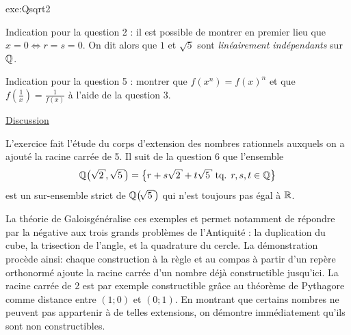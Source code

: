  {exe:Qsqrt2}{
	
	Indication pour la question 2 : il est possible de montrer en premier lieu que $x = 0 \iff r=s=0$.
	On dit alors que $1$ et $\sqrt5$ sont \emph{linéairement indépendants} sur $\mathbb{Q}$.
	
	Indication pour la question 5 : montrer que $f(x^n) = f(x)^n$ et que $f\left(\frac1x\right) = \frac1{f(x)}$ à l'aide de la question 3.
	
	\underline{Discussion}
	
	L'exercice fait l'étude du corps d'extension des nombres rationnels auxquels on a ajouté la racine carrée de 5.
	Il suit de la question 6 que l'ensemble 
		\[ \Q\bigl(\sqrt2, \sqrt5\bigr) = \bigset{ r + s \sqrt2 + t\sqrt5 \tq r, s, t \in \Q} \]
	est un sur-ensemble strict de $\Qsqrt5$ qui n'est toujours pas égal à $\mathbb{R}$.
	
	La {théorie de Galois}\footnotemark généralise ces exemples et permet notamment de répondre par la négative aux trois grands problèmes de l'Antiquité : la duplication du cube, la trisection de l'angle, et la quadrature du cercle.
	La démonstration procède ainsi: chaque construction à la règle et au compas à partir d'un repère orthonormé ajoute la racine carrée d'un nombre déjà constructible jusqu'ici.
	La racine carrée de 2 est par exemple constructible grâce au théorème de Pythagore comme distance entre $(1 ; 0)$ et $(0;1)$.
	En montrant que certains nombres ne peuvent pas appartenir à de telles extensions, on démontre immédiatement qu'ils sont non constructibles.
}


